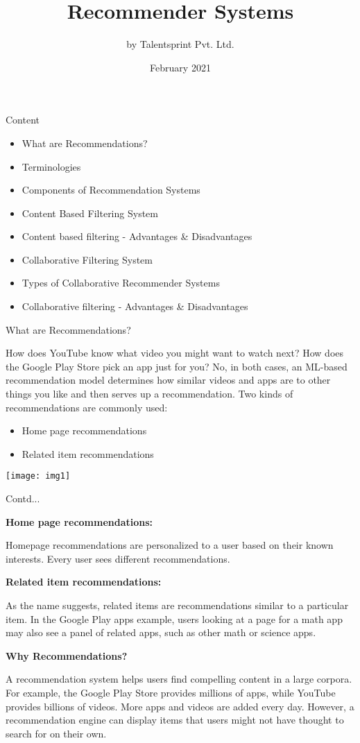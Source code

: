 \documentclass{beamer}
\title{Recommender Systems}
\author{by Talentsprint Pvt. Ltd.}
\date{February 2021}
\newcommand\myheading[1]{%
  \par\bigskip
  {\large\bfseries#1}\par\smallskip}
\begin{document}
\maketitle
\begin{frame}{Content}
	\begin{itemize}
		\item What are Recommendations?
		\item Terminologies
		\item Components of Recommendation Systems
		\item Content Based Filtering System
		\item Content based filtering - Advantages \& Disadvantages
		\item Collaborative Filtering System
		\item Types of Collaborative Recommender Systems
		\item Collaborative filtering - Advantages \& Disadvantages
	\end{itemize}
\end{frame}

\begin{frame}{What are Recommendations?}
	\begin{flushleft}
		How does YouTube know what video you might want to watch next? How does the Google Play Store pick an app just for you? No, in both cases, an ML-based recommendation model determines how similar videos and apps are to other things you like and then serves up a recommendation. Two kinds of recommendations are commonly used:
		\begin{itemize}
			\item Home page recommendations
			\item Related item recommendations
		\end{itemize}
	\end{flushleft}
	\texttt{[image: img1]}
\end{frame}

\begin{frame}{Contd...}
\begin{flushleft}
\myheading{Home page recommendations:}
	Homepage recommendations are personalized to a user based on their known interests. Every user sees different recommendations.
\myheading{Related item recommendations:}
	As the name suggests, related items are recommendations similar to a particular item. In the Google Play apps example, users looking at a page for a math app may also see a panel of related apps, such as other math or science apps.
\myheading{Why Recommendations?}
A recommendation system helps users find compelling content in a large corpora. For example, the Google Play Store provides millions of apps, while YouTube provides billions of videos. More apps and videos are added every day. However, a recommendation engine can display items that users might not have thought to search for on their own.
\end{flushleft} 
\end{frame}
\end{document}
